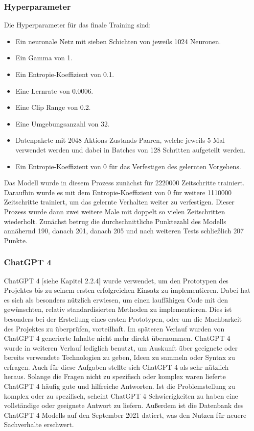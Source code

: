 \subsubsection{Hyperparameter}
Die Hyperparameter für das finale Training sind:

\begin{itemize} 
\item Ein neuronale Netz mit sieben Schichten von jeweils 1024 Neuronen. 

\item Ein Gamma von 1. 

\item Ein Entropie-Koeffizient von 0.1. 

\item Eine Lernrate von 0.0006. 

\item Eine Clip Range von 0.2. 

\item Eine Umgebungsanzahl von 32. 

\item Datenpakete mit 2048 Aktions-Zustands-Paaren, welche jeweils 5 Mal verwendet werden und dabei in Batches von 128 Schritten aufgeteilt werden. 

\item Ein Entropie-Koeffizient von 0 für das Verfestigen des gelernten Vorgehens. 
\end{itemize} 

Das Modell wurde in diesem Prozess zunächst für 2220000 Zeitschritte trainiert. Daraufhin wurde es mit dem Entropie-Koeffizient von 0 für weitere 1110000 Zeitschritte trainiert, um das gelernte Verhalten weiter zu verfestigen. Dieser Prozess wurde dann zwei weitere Male mit doppelt so vielen Zeitschritten wiederholt. Zunächst betrug die durchschnittliche Punktezahl des Modells annähernd 190, danach 201, danach 205 und nach weiteren Tests schließlich 207 Punkte.


\subsubsection{ChatGPT 4}
ChatGPT 4 [siehe Kapitel 2.2.4] wurde verwendet, um den Prototypen des Projektes bis zu seinem ersten erfolgreichen Einsatz zu implementieren. Dabei hat es sich als besonders nützlich erwiesen, um einen lauffähigen Code mit den gewünschten, relativ standardisierten Methoden zu implementieren. Dies ist besonders bei der Erstellung eines ersten Prototypen, oder um die Machbarkeit des Projektes zu überprüfen, vorteilhaft. Im späteren Verlauf wurden von ChatGPT 4 generierte Inhalte nicht mehr direkt übernommen. ChatGPT 4 wurde in weiteren Verlauf lediglich benutzt, um Auskunft über geeignete oder bereits verwendete Technologien zu geben, Ideen zu sammeln oder Syntax zu erfragen. Auch für diese Aufgaben stellte sich ChatGPT 4 als sehr nützlich heraus. Solange die Fragen nicht zu spezifisch oder komplex waren lieferte ChatGPT 4 häufig gute und hilfreiche Antworten. Ist die Problemstellung zu komplex oder zu spezifisch, scheint ChatGPT 4 Schwierigkeiten zu haben eine vollständige oder geeignete Antwort zu liefern. Außerdem ist die Datenbank des ChatGPT 4 Modells auf den September 2021 datiert, was den Nutzen für neuere Sachverhalte erschwert.